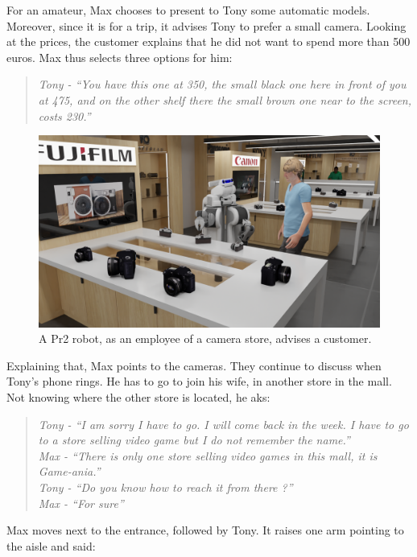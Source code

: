 For an amateur, Max chooses to present to Tony some automatic models. Moreover, since it is for a trip, it advises Tony to prefer a small camera. Looking at the prices, the customer explains that he did not want to spend more than 500 euros. Max thus selects three options for him:

\begin{quote} 
\centering 
\textit{
Tony - ``You have this one at 350, the small black one here in front of you at 475, and on the other shelf there the small brown one near to the screen, costs 230.'' }
\end{quote}

\begin{figure}[h!]
\centering
\includegraphics[width=\textwidth]{figures/introduction/camera_store_2.png}
\caption{\label{fig:cam_store} A Pr2 robot, as an employee of a camera store, advises a customer. }
\end{figure}

Explaining that, Max points to the cameras. They continue to discuss when Tony's phone rings. He has to go to join his wife, in another store in the mall. Not knowing where the other store is located, he aks:

\begin{quote}
\textit{
Tony - ``I am sorry I have to go. I will come back in the week. I have to go to a store selling video game but I do not remember the name.'' \\
Max - ``There is only one store selling video games in this mall, it is Game-ania.'' \\
Tony - ``Do you know how to reach it from there ?'' \\
Max - ``For sure''}
\end{quote}

Max moves next to the entrance, followed by Tony. It raises one arm pointing to the aisle and said:

